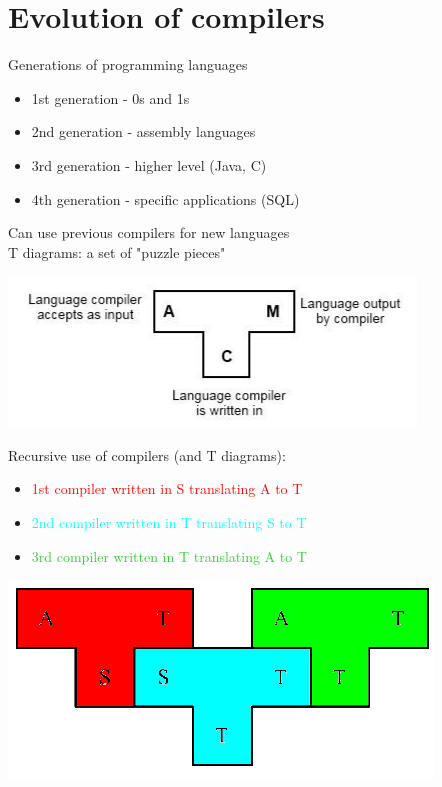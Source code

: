 \documentclass{article}[18pt]
\begin{document}
\section{Evolution of compilers}
Generations of programming languages
\begin{itemize}
	\item 1st generation - 0s and 1s
	\item 2nd generation - assembly languages
	\item 3rd generation - higher level (Java, C)
	\item 4th generation - specific applications (SQL)
\end{itemize}
Can use previous compilers for new languages\\
T diagrams: a set of "puzzle pieces"
\begin{center}
	\includegraphics[scale=0.7]{"T Diagram"}
\end{center}
Recursive use of compilers (and T diagrams):
\begin{itemize}
	\item \textcolor{red}{1st compiler written in S translating A to T}
	\item \textcolor{cyan}{2nd compiler written in T translating S to T}
	\item \textcolor{LimeGreen}{3rd compiler written in T translating A to T}
\end{itemize}
\begin{center}
	\includegraphics[scale=0.7]{"Recursive Compiler"}
\end{center}
\end{document}
